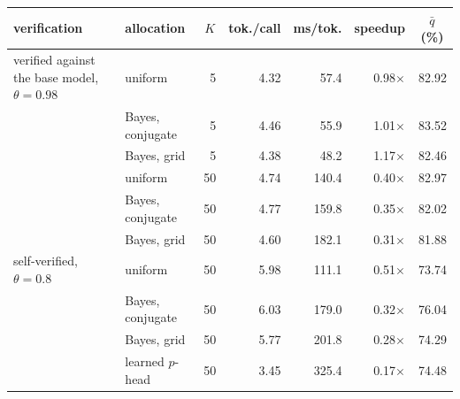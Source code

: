 {\setlength{\tabcolsep}{4pt}%
\begin{tabular}{llrrrrr}
\toprule
verification & allocation & \multicolumn{1}{c}{$K$} & \multicolumn{1}{c}{tok./call} & \multicolumn{1}{c}{ms/tok.} & \multicolumn{1}{c}{speedup} & \multicolumn{1}{c}{$\bar q$ (\%)} \\
\midrule
verified against the base model, $\theta=0.98$ & uniform & 5 & 4.32 & 57.4 & 0.98$\times$ & 82.92 \\
 & Bayes, conjugate & 5 & 4.46 & 55.9 & 1.01$\times$ & 83.52 \\
 & Bayes, grid & 5 & 4.38 & 48.2 & 1.17$\times$ & 82.46 \\
 & uniform & 50 & 4.74 & 140.4 & 0.40$\times$ & 82.97 \\
 & Bayes, conjugate & 50 & 4.77 & 159.8 & 0.35$\times$ & 82.02 \\
 & Bayes, grid & 50 & 4.60 & 182.1 & 0.31$\times$ & 81.88 \\
\midrule
self-verified, $\theta=0.8$ & uniform & 50 & 5.98 & 111.1 & 0.51$\times$ & 73.74 \\
 & Bayes, conjugate & 50 & 6.03 & 179.0 & 0.32$\times$ & 76.04 \\
 & Bayes, grid & 50 & 5.77 & 201.8 & 0.28$\times$ & 74.29 \\
 & learned $p$-head & 50 & 3.45 & 325.4 & 0.17$\times$ & 74.48 \\
\bottomrule
\end{tabular}
}
